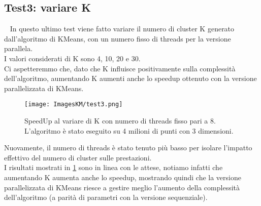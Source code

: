 \documentclass[10pt,twocolumn,letterpaper]{article}
\begin{document}
\subsection{Test3: variare K}\
\label{sec:t3}
In questo ultimo test viene fatto variare il numero di cluster K generato dall'algoritmo di KMeans, con un numero fisso di threads per la versione parallela.\\
I valori considerati di K sono 4, 10, 20 e 30.\\
Ci aspetteremmo che, dato che K influisce positivamente sulla complessità dell'algoritmo, aumentando K aumenti anche lo speedup ottenuto con la versione parallelizzata di KMeans.
\begin{figure}[h]
    \centering
    \texttt{[image: ImagesKM/test3.png]}
    \caption{SpeedUp al variare di K con numero di threads fisso pari a 8. L'algoritmo è stato eseguito su 4 milioni di punti con 3 dimensioni.}
    \label{fig:t3}
\end{figure}
Nuovamente, il numero di threads è stato tenuto più basso per isolare l'impatto effettivo del numero di cluster sulle prestazioni.\\
I risultati mostrati in \cref{fig:t3} sono in linea con le attese, notiamo infatti che aumentando K aumenta anche lo speedup, mostrando quindi che la versione parallelizzata di KMeans riesce a gestire meglio l'aumento della complessità dell'algoritmo (a parità di parametri con la versione sequenziale).
\end{document}

